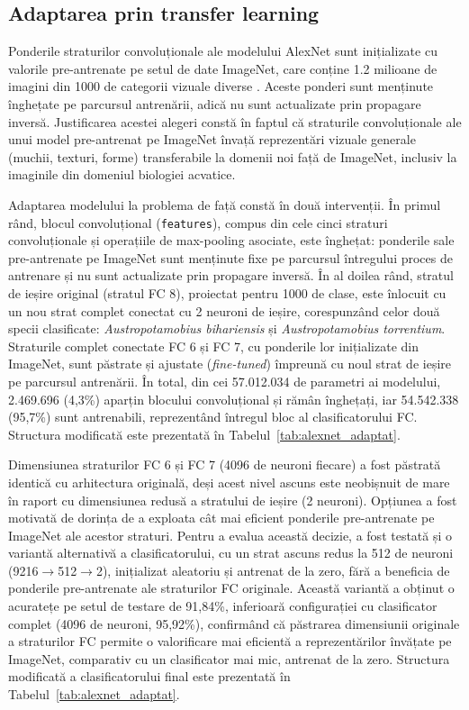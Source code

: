 \subsection{Adaptarea prin transfer learning}

Ponderile straturilor convoluționale ale modelului AlexNet sunt inițializate cu valorile pre-antrenate pe setul de date ImageNet, care conține 1.2 milioane de imagini din 1000 de categorii vizuale diverse \cite{krizhevsky2012imagenet}. Aceste ponderi sunt menținute înghețate pe parcursul antrenării, adică nu sunt actualizate prin propagare inversă. Justificarea acestei alegeri constă în faptul că straturile convoluționale ale unui model pre-antrenat pe ImageNet învață reprezentări vizuale generale (muchii, texturi, forme) transferabile la domenii noi față de ImageNet, inclusiv la imaginile din domeniul biologiei acvatice.

Adaptarea modelului la problema de față constă în două intervenții. În primul rând, blocul convoluțional (\texttt{features}), compus din cele cinci straturi convoluționale și operațiile de max-pooling asociate, este înghețat: ponderile sale pre-antrenate pe ImageNet sunt menținute fixe pe parcursul întregului proces de antrenare și nu sunt actualizate prin propagare inversă. În al doilea rând, stratul de ieșire original (stratul FC 8), proiectat pentru 1000 de clase, este înlocuit cu un nou strat complet conectat cu 2 neuroni de ieșire, corespunzând celor două specii clasificate: \textit{Austropotamobius bihariensis} și \textit{Austropotamobius torrentium}. Straturile complet conectate FC 6 și FC 7, cu ponderile lor inițializate din ImageNet, sunt păstrate și ajustate (\textit{fine-tuned}) împreună cu noul strat de ieșire pe parcursul antrenării. În total, din cei 57.012.034 de parametri ai modelului, 2.469.696 (4,3\%) aparțin blocului convoluțional și rămân înghețați, iar 54.542.338 (95,7\%) sunt antrenabili, reprezentând întregul bloc al clasificatorului FC. Structura modificată este prezentată în Tabelul~\ref{tab:alexnet_adaptat}.

Dimensiunea straturilor FC 6 și FC 7 (4096 de neuroni fiecare) a fost păstrată identică cu arhitectura originală, deși acest nivel ascuns este neobișnuit de mare în raport cu dimensiunea redusă a stratului de ieșire (2 neuroni). Opțiunea a fost motivată de dorința de a exploata cât mai eficient ponderile pre-antrenate pe ImageNet ale acestor straturi. Pentru a evalua această decizie, a fost testată și o variantă alternativă a clasificatorului, cu un strat ascuns redus la 512 de neuroni (9216$\rightarrow$512$\rightarrow$2), inițializat aleatoriu și antrenat de la zero, fără a beneficia de ponderile pre-antrenate ale straturilor FC originale. Această variantă a obținut o acuratețe pe setul de testare de 91,84\%, inferioară configurației cu clasificator complet (4096 de neuroni, 95,92\%), confirmând că păstrarea dimensiunii originale a straturilor FC permite o valorificare mai eficientă a reprezentărilor învățate pe ImageNet, comparativ cu un clasificator mai mic, antrenat de la zero. Structura modificată a clasificatorului final este prezentată în Tabelul~\ref{tab:alexnet_adaptat}.

